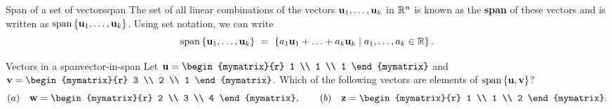 \begin{definition}{Span of a set of vectors}{span}
  The set of all linear combinations of the vectors
  $\vect{u}_1, \ldots ,\vect{u}_k$ in $\mathbb{R}^{n}$ is known as the
  \textbf{span} of these vectors and is written
  as $\sspan\set{\vect{u}_1,\ldots,\vect{u}_k}$. Using set notation,
  we can write
  \begin{equation*}
    \sspan\set{\vect{u}_1,\ldots,\vect{u}_k}
    ~=~ \set{a_1\vect{u}_1+\ldots+a_k\vect{u}_k \mid a_1,\ldots,a_k\in\R}.
  \end{equation*}
\end{definition}

\begin{example}{Vectors in a span}{vector-in-span}
  Let $\vect{u}=\begin{mymatrix}{r} 1 \\ 1 \\ 1 \end{mymatrix}$ and
  $\vect{v}=\begin{mymatrix}{r} 3 \\ 2 \\ 1 \end{mymatrix}$. Which
  of the following vectors are elements of
  $\sspan\set{\vect{u},\vect{v}}$?
  \begin{equation*}
    (a)\quad\vect{w} = \begin{mymatrix}{r} 2 \\ 3 \\ 4 \end{mymatrix},
    \qquad
    (b)\quad\vect{z} = \begin{mymatrix}{r} 1 \\ 1 \\ 2 \end{mymatrix}.
  \end{equation*}
\end{example}

